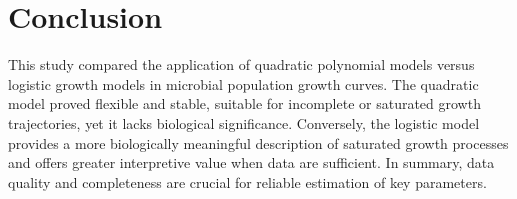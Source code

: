 \documentclass{article}
\begin{document}
\section{Conclusion}
This study compared the application of quadratic polynomial models versus logistic growth models in microbial population growth curves. The quadratic model proved flexible and stable, suitable for incomplete or saturated growth trajectories, yet it lacks biological significance. Conversely, the logistic model provides a more biologically meaningful description of saturated growth processes and offers greater interpretive value when data are sufficient. In summary, data quality and completeness are crucial for reliable estimation of key parameters.
\end{document}
